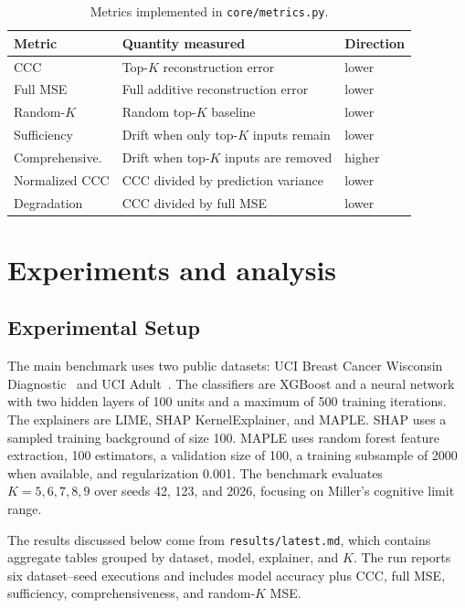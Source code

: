 \documentclass[sigconf,nonacm]{acmart}
\begin{document}
\begin{table}[t]
  \caption{Metrics implemented in \texttt{core/metrics.py}.}
  \label{tab:metrics}
  \centering
  \small
  \begin{tabular}{p{}p{}p{}}
    \toprule
    Metric & Quantity measured & Direction \\
    \midrule
    CCC & Top-$K$ reconstruction error & lower \\
    Full MSE & Full additive reconstruction error & lower \\
    Random-$K$ & Random top-$K$ baseline & lower \\
    Sufficiency & Drift when only top-$K$ inputs remain & lower \\
    Comprehensive. & Drift when top-$K$ inputs are removed & higher \\
    Normalized CCC & CCC divided by prediction variance & lower \\
    Degradation & CCC divided by full MSE & lower \\
    \bottomrule
  \end{tabular}
\end{table}

\section{Experiments and analysis}
\subsection{Experimental Setup}
The main benchmark uses two public datasets: UCI Breast Cancer Wisconsin
Diagnostic~\cite{uciwdbc} and UCI Adult~\cite{uciadult}. The classifiers are
XGBoost and a neural network with two hidden layers of 100 units and a maximum
of 500 training iterations. The explainers are LIME, SHAP KernelExplainer, and
MAPLE. SHAP uses a sampled training background of size 100. MAPLE uses random
forest feature extraction, 100 estimators, a validation size of 100, a training
subsample of 2000 when available, and regularization 0.001. The benchmark
evaluates $K=5,6,7,8,9$ over seeds 42, 123, and 2026, focusing on Miller's cognitive limit range.

The results discussed below come from \texttt{results/latest.md}, which contains aggregate tables grouped by dataset,
model, explainer, and $K$. The run reports six dataset--seed executions and
includes model accuracy plus CCC, full MSE, sufficiency, comprehensiveness, and
random-$K$ MSE.
\end{document}
